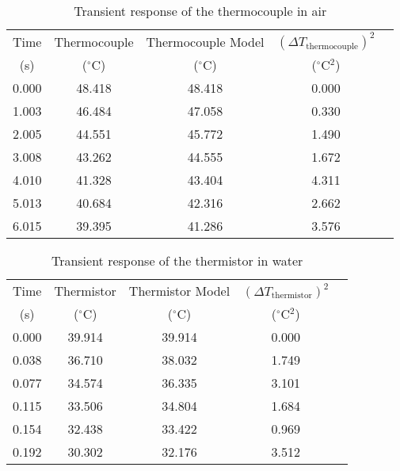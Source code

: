 \begin{table}
    \centering
    \caption{Transient response of the thermocouple in air}
    \label{tab:thermocouple_transient_air}
    \begin{tabular}{ccccc}
        \toprule
        Time & Thermocouple  & Thermocouple Model  & $(\Delta T_{\text{thermocouple}})^2$ \\
        (s) & ($^\circ$C) & ($^\circ$C) & ($^\circ$C$^2$)\\
        \midrule
        0.000 & 48.418 & 48.418 & 0.000 \\
        1.003 & 46.484 & 47.058 & 0.330 \\
        2.005 & 44.551 & 45.772 & 1.490 \\
        3.008 & 43.262 & 44.555 & 1.672 \\
        4.010 & 41.328 & 43.404 & 4.311 \\
        5.013 & 40.684 & 42.316 & 2.662 \\
        6.015 & 39.395 & 41.286 & 3.576 \\
        \bottomrule
    \end{tabular}
\end{table}
\begin{table}
    \centering
    \caption{Transient response of the thermistor in water}
    \label{tab:thermistor_transient_water}
    \begin{tabular}{ccccc}
        \toprule
        Time & Thermistor  & Thermistor Model  & $(\Delta T_{\text{thermistor}})^2$ \\
        (s) & ($^\circ$C) & ($^\circ$C) & ($^\circ$C$^2$)\\
        \midrule
        0.000 & 39.914 & 39.914 & 0.000 \\
        0.038 & 36.710 & 38.032 & 1.749 \\
        0.077 & 34.574 & 36.335 & 3.101 \\
        0.115 & 33.506 & 34.804 & 1.684 \\
        0.154 & 32.438 & 33.422 & 0.969 \\
        0.192 & 30.302 & 32.176 & 3.512 \\
        \bottomrule
    \end{tabular}
\end{table}
